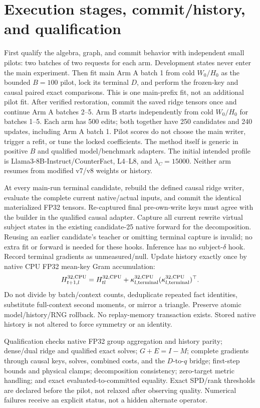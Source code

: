 \documentclass[10pt]{article}
\begin{document}
\newpage
\section{Execution stages, commit/history, and qualification}
First qualify the algebra, graph, and commit behavior with independent
small pilots: two batches of two requests for each arm. Development
states never enter the main experiment. Then fit main Arm A batch 1 from
cold $W_0/H_0$ as the bounded $B=100$ pilot, lock its terminal $D$, and
perform the frozen-key and causal paired exact comparisons. This is one
main-prefix fit, not an additional pilot fit. After verified restoration,
commit the saved ridge tensors once and continue Arm A batches 2--5.
Arm B starts independently from cold $W_0/H_0$ for batches 1--5. Each
arm has 500 edits; both together have 250 candidates and 240 updates,
including Arm A batch 1. Pilot scores do not choose the main writer,
trigger a refit, or tune the locked coefficients. The method itself is
generic in positive $B$ and qualified model/benchmark adapters.
The initial intended profile is Llama3-8B-Instruct/CounterFact, L4--L8,
and $\lambda_C=15000$. Neither arm resumes from modified v7/v8 weights
or history.

At every main-run terminal candidate, rebuild the defined causal ridge
writer, evaluate the complete current native/actual inputs, and commit
the identical materialized FP32 tensors. Re-captured final pre-own-write
keys must agree with the builder in the qualified causal adapter.
Capture all current rewrite virtual subject states in the existing
candidate-25 native forward for the decomposition. Reusing an earlier
candidate's teacher or omitting terminal capture is invalid; no extra
fit or forward is needed for these hooks.
Inference has no subject-$\delta$ hook. Record terminal gradients as
unmeasured/null. Update history exactly once by native CPU FP32 mean-key
Gram accumulation:
\[
 H^{32,\rm CPU}_{t+1,l}=H^{32,\rm CPU}_{tl}
 +\kappa^{32,\rm CPU}_{l,\rm terminal}
  (\kappa^{32,\rm CPU}_{l,\rm terminal})^\top.
\]
Do not divide by batch/context counts, deduplicate repeated fact identities,
substitute full-context second moments, or mirror a triangle. Preserve
atomic model/history/RNG rollback. No replay-memory transaction exists.
Stored native history is not altered to force symmetry or an identity.

Qualification checks native FP32 group aggregation and history parity;
dense/dual ridge and qualified exact solves; $G+E=I-M$; complete
gradients through causal keys, solves, combined costs, and the $D$-to-$q$
bridge; first-step bounds and physical clamps; decomposition consistency;
zero-target metric handling; and exact evaluated-to-committed equality.
Exact SPD/rank thresholds are declared before the pilot, not relaxed
after observing quality. Numerical failures receive an explicit status,
not a hidden alternate operator.
\end{document}
